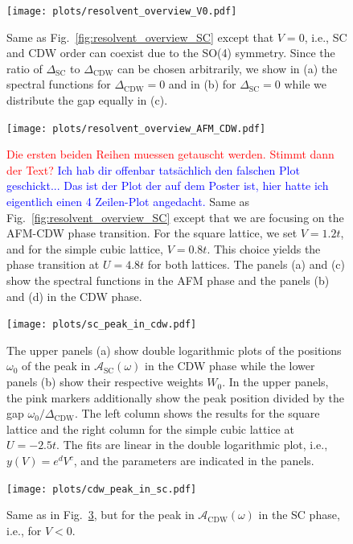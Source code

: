 \documentclass[
    reprint, 
    aps,
    preprintnumbers,
    twocolumn,
    prb,
    superscriptaddress
]{revtex4-2}
\newcommand{\spectral}[1]{\mathcal{A}_\text{#1}  (\omega)}
\newcommand{\red}[1]{\textcolor{red}{#1}}
\newcommand{\blue}[1]{\textcolor{blue}{#1}}
\begin{document}
\begin{figure}
    \centering
    \texttt{[image: plots/resolvent\_overview\_V0.pdf]}
    \caption{Same as Fig.\ \ref{fig:resolvent_overview_SC} except that  $V=0$, i.e., 
		SC and CDW order can coexist due to the SO(4) symmetry.
    Since the ratio of $\Delta_\text{SC}$ to $\Delta_\text{CDW}$ can be chosen arbitrarily, 
    we show in (a) the spectral functions for $\Delta_\text{CDW} = 0$ and in (b) for $\Delta_\text{SC} = 0$ while we distribute the gap equally in (c).}
    \label{fig:resolvent_overview_V0}
\end{figure}

\begin{figure}
    \centering
    \texttt{[image: plots/resolvent\_overview\_AFM\_CDW.pdf]}
    \caption{\red{Die ersten beiden Reihen muessen getauscht werden. Stimmt dann der Text?} 
    \blue{Ich hab dir offenbar tatsächlich den falschen Plot geschickt... 
    Das ist der Plot der auf dem Poster ist, hier hatte ich eigentlich einen 4 Zeilen-Plot angedacht.}
		Same as Fig.\ \ref{fig:resolvent_overview_SC} except that we are focusing 
		on the AFM-CDW phase transition.
    For the square lattice, we set $V=1.2t$, and for the simple cubic lattice, $V=0.8t$. 
		This choice yields the phase transition at $U=4.8t$ for both lattices.
    The panels (a) and (c) show the spectral functions in the AFM phase and the 
		panels (b) and (d) in the CDW phase.}
    \label{fig:resolvent_overview_AFM}
\end{figure}

\begin{figure}
    \centering
    \texttt{[image: plots/sc\_peak\_in\_cdw.pdf]}
    \caption{The upper panels (a) show double logarithmic plots of the positions $\omega_0$ of the peak in $\spectral{SC}$ in the CDW phase 
    while the lower panels (b) show their respective weights $W_0$.
    In the upper panels, the pink markers additionally show the peak position divided by the gap $\omega_0 / \Delta_\text{CDW}$. 
    The left column shows the results for the square lattice and the right column for the simple cubic lattice at $U=-2.5t$. 
    The fits are linear in the double logarithmic plot, i.e., $y(V) = e^d V^c$, and the parameters are indicated in the panels.}
    \label{fig:sc_in_cdw_behavior}
\end{figure}

\begin{figure}
    \centering
    \texttt{[image: plots/cdw\_peak\_in\_sc.pdf]}
    \caption{Same as in Fig.\ \ref{fig:sc_in_cdw_behavior}, but for the peak in $\spectral{CDW}$ 
		in the SC phase, i.e., for $V<0$.}
    \label{fig:cdw_in_sc_behavior}
\end{figure}
\end{document}
